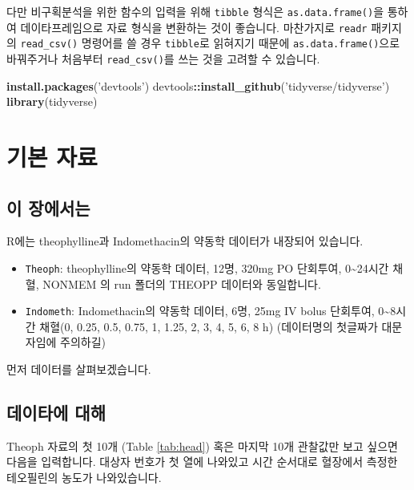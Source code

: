 \documentclass[12pt,]{krantz}
\newenvironment{Shaded}{\begin{snugshade}}{\end{snugshade}}
\newcommand{\KeywordTok}[1]{\textcolor[rgb]{0.13,0.29,0.53}{\textbf{#1}}}
\newcommand{\StringTok}[1]{\textcolor[rgb]{0.31,0.60,0.02}{#1}}
\newcommand{\OperatorTok}[1]{\textcolor[rgb]{0.81,0.36,0.00}{\textbf{#1}}}
\newcommand{\NormalTok}[1]{#1}
\providecommand{\tightlist}{%
  \setlength{\itemsep}{0pt}\setlength{\parskip}{0pt}}
\theoremstyle{definition}
\theoremstyle{definition}
\theoremstyle{definition}
\theoremstyle{remark}
\begin{document}
다만 비구획분석을 위한 함수의 입력을 위해 \texttt{tibble} 형식은
\texttt{as.data.frame()}을 통하여 데이타프레임으로 자료 형식을 변환하는
것이 좋습니다. 마찬가지로 \texttt{readr} 패키지의 \texttt{read\_csv()}
명령어를 쓸 경우 \texttt{tibble}로 읽혀지기 때문에
\texttt{as.data.frame()}으로 바꿔주거나 처음부터 \texttt{read\_csv()}를
쓰는 것을 고려할 수 있습니다.

\begin{Shaded}
\begin{Highlighting}[]
\KeywordTok{install.packages}\NormalTok{(}\StringTok{'devtools'}\NormalTok{)}
\NormalTok{devtools}\OperatorTok{::}\KeywordTok{install_github}\NormalTok{(}\StringTok{'tidyverse/tidyverse'}\NormalTok{)}
\KeywordTok{library}\NormalTok{(tidyverse)}
\end{Highlighting}
\end{Shaded}

\chapter{기본 자료}\label{datasets}

\section{이 장에서는}\label{introdatasets}

R에는 theophylline과 Indomethacin의 약동학 데이터가 내장되어 있습니다.

\begin{itemize}
\tightlist
\item
  \texttt{Theoph}: theophylline의 약동학 데이터, 12명, 320mg PO
  단회투여, 0\textasciitilde{}24시간 채혈, NONMEM 의 run 폴더의 THEOPP
  데이터와 동일합니다.
\item
  \texttt{Indometh}: Indomethacin의 약동학 데이터, 6명, 25mg IV bolus
  단회투여, 0\textasciitilde{}8시간 채혈(0, 0.25, 0.5, 0.75, 1, 1.25, 2,
  3, 4, 5, 6, 8 h) (데이터명의 첫글짜가 대문자임에 주의하길)
\end{itemize}

먼저 데이터를 살펴보겠습니다.

\section{데이타에 대해}\label{TheophData}

Theoph 자료의 첫 10개 (Table \ref{tab:head}) 혹은 마지막 10개 관찰값만
보고 싶으면 다음을 입력합니다. 대상자 번호가 첫 열에 나와있고 시간
순서대로 혈장에서 측정한 테오필린의 농도가 나와있습니다.
\end{document}

